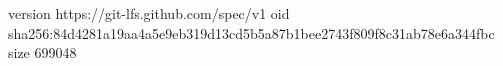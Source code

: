 version https://git-lfs.github.com/spec/v1
oid sha256:84d4281a19aa4a5e9eb319d13cd5b5a87b1bee2743f809f8c31ab78e6a344fbc
size 699048
